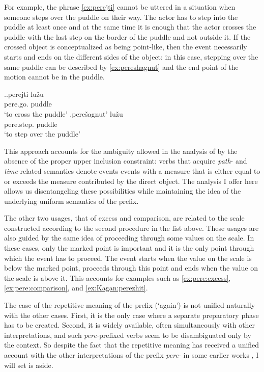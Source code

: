 For example, the phrase \ref{ex:perejti} cannot be uttered in a situation when someone steps over the puddle on their way. The actor has to step into the puddle at least once and at the same time it is enough that the actor crosses the puddle with the last step on the border of the puddle and not outside it. If the crossed object is conceptualized as being point-like, then the event necessarily starts and ends on the different sides of the object: in this case, stepping over the same puddle can be described by \ref{ex:pereshagnut} and the end point of the motion cannot be in the puddle.


\ex.\ag.\label{ex:perejti}perejti lu\v{z}u\\
pere.go. puddle\\
\trans `to cross the puddle'
\bg.\label{ex:pereshagnut}pere\v{s}agnut' lu\v{z}u\\
pere.step. puddle\\
\trans `to step over the puddle'

This approach accounts for the ambiguity allowed in the analysis of \citet{Kagan:book} by the absence of the proper upper inclusion constraint: verbs that acquire \textit{path}- and \textit{time}-related semantics denote events events with a measure that is either equal to or exceeds the measure contributed by the direct object. The analysis I offer here allows us disentangeling these possibilities while maintaining the idea of the underlying uniform semantics of the prefix.

The other two usages, that of excess and comparison, are related to the scale constructed according to the second procedure in the list above. These usages are also guided by the same idea of proceeding through some values on the scale. In these cases, only the marked point is important and it is the only point through which the event has to proceed. The event starts when the value on the scale is below the marked point, proceeds through this point and ends when the value on the scale is above it. This accounts for examples such as \ref{ex:pere:excess}, \ref{ex:pere:comparison}, and \ref{ex:Kagan:perezhit}.

The case of the repetitive meaning of the prefix (`again') is not unified naturally with the other cases. First, it is the only case where a separate preparatory phase has to be created. Second, it is widely available, often simultaneously with other interpretations, and such \textit{pere-}prefixed verbs seem to be disambiguated only by the context. So despite the fact that the repetitive meaning has received a unified account with the other interpretations of the prefix \textit{pere-} in some earlier works \citep{Demjjanow:97, Kagan:book}, I will set is aside.

